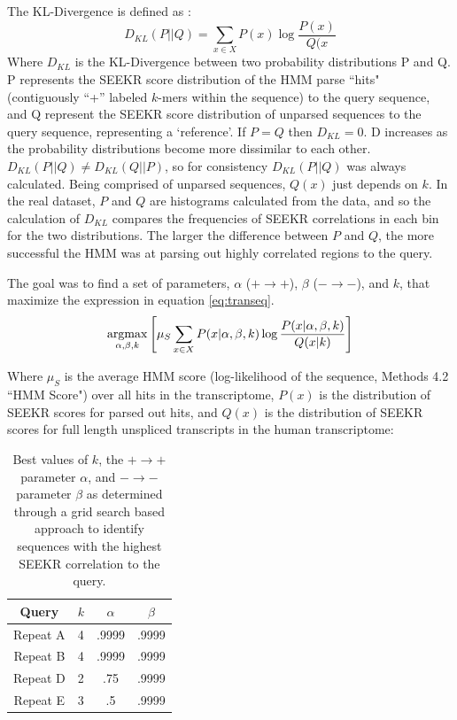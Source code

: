 The KL-Divergence is defined as \cite{Brookes1951FoundationsProbability}:
\begin{equation}
    D_{KL}(P||Q) = \sum_{x\in X}P(x)\log{\frac{P(x)}{Q(x}}
\end{equation}
Where $D_{KL}$ is the KL-Divergence between two probability distributions P and Q. P represents the SEEKR score distribution of the HMM parse ``hits" (contiguously ``+'' labeled $k$-mers within the sequence) to the query sequence, and Q represent the SEEKR score distribution of unparsed sequences to the query sequence, representing a ‘reference’. If $P = Q$ then $D_{KL} = 0$. D increases as the probability distributions become more dissimilar to each other. $D_{KL}(P||Q) \neq D_{KL}(Q||P)$, so for consistency $D_{KL}(P||Q)$ was always calculated. Being comprised of unparsed sequences, $Q(x)$ just depends on $k$.
In the real dataset, $P$ and $Q$ are histograms calculated from the data, and so the calculation of $D_{KL}$ compares the frequencies of SEEKR correlations in each bin for the two distributions. The larger the difference between $P$ and $Q$, the more successful the HMM was at parsing out highly correlated regions to the query.

The goal was to find a set of parameters, $\alpha$ ($+\rightarrow +$), $\beta$ ($-\rightarrow -$), and $k$, that maximize the expression in equation \ref{eq:transeq}.
\begin{equation}
    \operatorname*{argmax}_{\alpha,\beta,k}\left[\mu_S\sum_{x\in X}P(x|\alpha,\beta,k)\log{\frac{P(x|\alpha,\beta,k)}{Q(x|k)}}\right]
\label{eq:transeq}
\end{equation}

Where $\mu_S$ is the average HMM score (log-likelihood of the sequence, Methods 4.2 ``HMM Score") over all hits in the transcriptome, $P(x)$ is the distribution of SEEKR scores for parsed out hits, and $Q(x)$ is the distribution of SEEKR scores for full length unspliced transcripts in the human transcriptome: 

\begin{table}[h]
\centering
\begin{center}
 \begin{tabular}{|c | c| c | c |} 
 \hline
 Query & $k$ & $\alpha$ & $\beta$ \\
 \hline\hline
 Repeat A & 4 & .9999 & .9999 \\ 
 \hline
 Repeat B & 4 & .9999 & .9999\\
 \hline
 Repeat D & 2 & .75 & .9999\\
 \hline
 Repeat E & 3 & .5 & .9999\\
 \hline
\end{tabular}
\end{center}
\caption[KL-Divergence best fit parameters]{Best values of $k$, the $+\rightarrow +$ parameter $\alpha$, and $-\rightarrow -$ parameter $\beta$ as determined through a grid search based approach to identify sequences with the highest SEEKR correlation to the query.}
\label{tbl:transparams}
\end{table}

